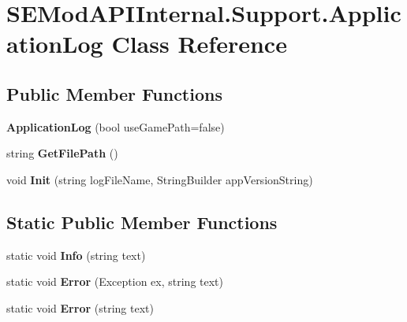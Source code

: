 \hypertarget{class_s_e_mod_a_p_i_internal_1_1_support_1_1_application_log}{}\section{S\+E\+Mod\+A\+P\+I\+Internal.\+Support.\+Application\+Log Class Reference}
\label{class_s_e_mod_a_p_i_internal_1_1_support_1_1_application_log}
\subsection*{Public Member Functions}
\begin{DoxyCompactItemize}
\item 
\hypertarget{class_s_e_mod_a_p_i_internal_1_1_support_1_1_application_log_a1735b46e9a76069639b02d572bc16d17}{}{\bfseries Application\+Log} (bool use\+Game\+Path=false)\label{class_s_e_mod_a_p_i_internal_1_1_support_1_1_application_log_a1735b46e9a76069639b02d572bc16d17}

\item 
\hypertarget{class_s_e_mod_a_p_i_internal_1_1_support_1_1_application_log_a9101ff418f49aa3e20345fce23d29233}{}string {\bfseries Get\+File\+Path} ()\label{class_s_e_mod_a_p_i_internal_1_1_support_1_1_application_log_a9101ff418f49aa3e20345fce23d29233}

\item 
\hypertarget{class_s_e_mod_a_p_i_internal_1_1_support_1_1_application_log_af0f49b183a6c2a9631d6aa35730a750a}{}void {\bfseries Init} (string log\+File\+Name, String\+Builder app\+Version\+String)\label{class_s_e_mod_a_p_i_internal_1_1_support_1_1_application_log_af0f49b183a6c2a9631d6aa35730a750a}

\end{DoxyCompactItemize}
\subsection*{Static Public Member Functions}
\begin{DoxyCompactItemize}
\item 
\hypertarget{class_s_e_mod_a_p_i_internal_1_1_support_1_1_application_log_a96a2a0ff5e1b2e8f26c15533c55024c2}{}static void {\bfseries Info} (string text)\label{class_s_e_mod_a_p_i_internal_1_1_support_1_1_application_log_a96a2a0ff5e1b2e8f26c15533c55024c2}

\item 
\hypertarget{class_s_e_mod_a_p_i_internal_1_1_support_1_1_application_log_ad923accd1eafa2e10bfad8e2750fad2e}{}static void {\bfseries Error} (Exception ex, string text)\label{class_s_e_mod_a_p_i_internal_1_1_support_1_1_application_log_ad923accd1eafa2e10bfad8e2750fad2e}

\item 
\hypertarget{class_s_e_mod_a_p_i_internal_1_1_support_1_1_application_log_a035fedb8c95e4365ad2ae3b24e77d152}{}static void {\bfseries Error} (string text)\label{class_s_e_mod_a_p_i_internal_1_1_support_1_1_application_log_a035fedb8c95e4365ad2ae3b24e77d152}

\end{DoxyCompactItemize}
